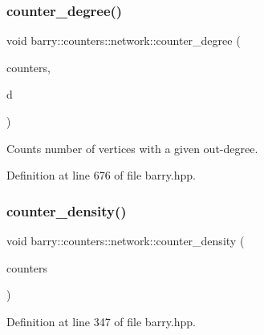 \subsubsection{\texorpdfstring{counter\+\_\+degree()}{counter\_degree()}}
{\footnotesize\ttfamily void barry\+::counters\+::network\+::counter\+\_\+degree (\begin{DoxyParamCaption}\item[{\hyperlink{namespacebarry_1_1counters_1_1network_aa72fdb34752ac24167a06ee196a8fff6}{Net\+Counters} $\ast$}]{counters,  }\item[{std\+::vector$<$ \hyperlink{namespacebarry_a11dfc53ddb4672278319aa04f1e09a6c}{uint} $>$}]{d }\end{DoxyParamCaption})\hspace{0.3cm}{\ttfamily [inline]}}



Counts number of vertices with a given out-\/degree. 



Definition at line 676 of file barry.\+hpp.

\mbox{\label{namespacebarry_1_1counters_1_1network_a91e3daed40ea0514e0ede00ab303a738}} 
\subsubsection{\texorpdfstring{counter\+\_\+density()}{counter\_density()}}
{\footnotesize\ttfamily void barry\+::counters\+::network\+::counter\+\_\+density (\begin{DoxyParamCaption}\item[{\hyperlink{namespacebarry_1_1counters_1_1network_aa72fdb34752ac24167a06ee196a8fff6}{Net\+Counters} $\ast$}]{counters }\end{DoxyParamCaption})\hspace{0.3cm}{\ttfamily [inline]}}



Definition at line 347 of file barry.\+hpp.

\mbox{\label{namespacebarry_1_1counters_1_1network_a2050eea4ac26f5e10483622633081962}} 
